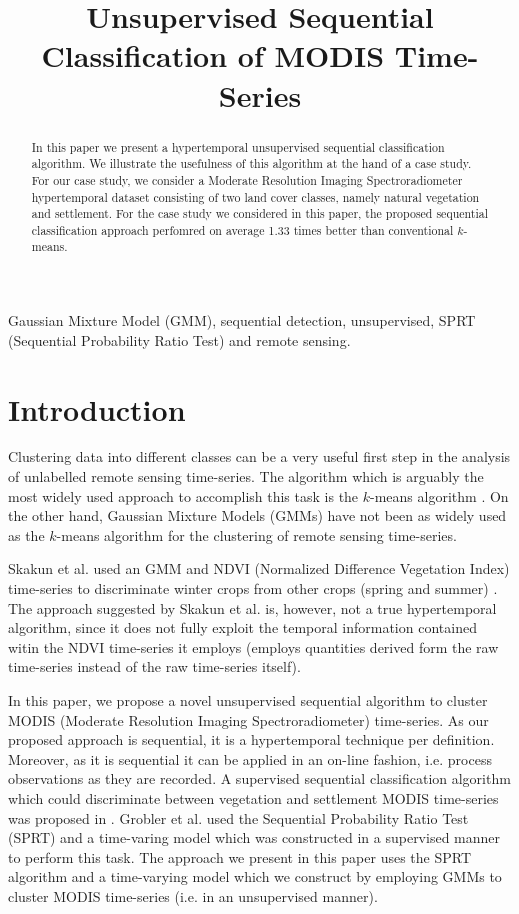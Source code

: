 \documentclass{article}
\title{Unsupervised Sequential Classification of MODIS Time-Series}
\begin{document}
%
\maketitle
%
\begin{abstract}
In this paper we present a hypertemporal unsupervised sequential classification algorithm.  
We illustrate the usefulness of this algorithm at the hand of a case study. For our case study, we consider a Moderate Resolution Imaging Spectroradiometer hypertemporal dataset consisting of two land cover classes, namely natural vegetation and settlement. For the 
case study we considered in this paper, the proposed sequential classification approach perfomred on average 1.33 times better than conventional $k$-means.
\end{abstract}
%
\begin{keywords}
Gaussian Mixture Model (GMM), sequential detection, unsupervised, SPRT (Sequential Probability Ratio Test) and remote sensing.
\end{keywords}
%

\section{Introduction}
\label{sec:intro}
Clustering data into different classes can be a very useful first step in the analysis of unlabelled remote sensing time-series. The algorithm
which is arguably the most widely used approach to accomplish this task is the $k$-means algorithm \cite{chen2013,viovy2000}. On the other hand, Gaussian Mixture Models (GMMs) have not been 
as widely used as the $k$-means algorithm for the clustering of remote sensing time-series.

Skakun et al. used an GMM and NDVI (Normalized Difference Vegetation Index) time-series to discriminate winter crops from other crops (spring and summer) \cite{skakun2017}.
The approach suggested by Skakun et al. is, however, not a true hypertemporal algorithm, since it does not fully exploit the temporal information contained witin the NDVI time-series it employs (employs quantities derived 
form the raw time-series instead of the raw time-series itself).

In this paper, we propose a novel unsupervised sequential algorithm to cluster MODIS (Moderate Resolution Imaging Spectroradiometer) time-series. As our proposed approach is sequential, it is a hypertemporal technique per definition.
Moreover, as it is sequential it can be applied in an on-line fashion, i.e. process observations as they are recorded. A supervised sequential classification algorithm which could discriminate 
between vegetation and settlement MODIS time-series was proposed in \cite{ackermann2011t,grobler2012,grobler2012c}. Grobler et al. used the Sequential Probability Ratio Test (SPRT) and a time-varing model which was constructed in a supervised manner to perform this task. 
The approach we present in this paper uses the SPRT algorithm and a time-varying model which we construct by employing GMMs to cluster MODIS time-series (i.e. in an unsupervised manner).
\end{document}
